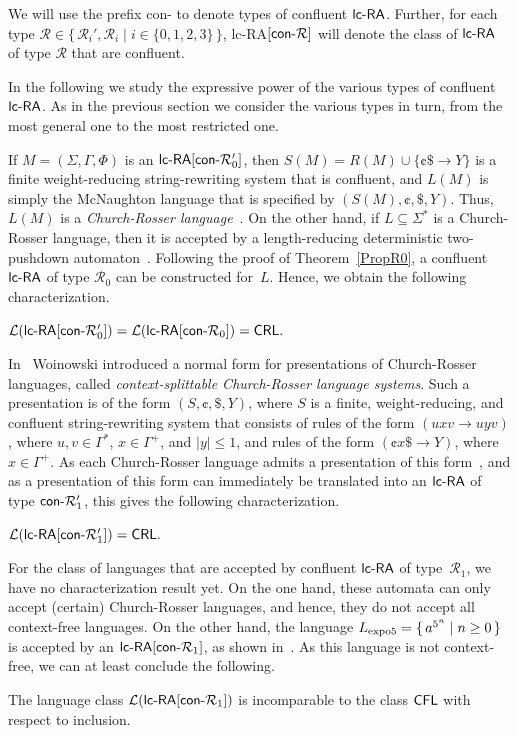 We will use the prefix {\sf con-} to denote types of confluent $\lcRA$. Further, for each type $\mathcal{R}\in\{\,\mathcal{R}_i',\mathcal{R}_i\mid i\in\{0,1,2,3\}\,\}$, {\sf lc-RA$[\textup{\sf con-}\mathcal{R}]$} will denote the class of $\lcRA$ of type $\mathcal{R}$ that are confluent.

In the following we study the expressive power of the various types of confluent $\lcRA$. As in the previous section we consider the various types in turn, from the most general one to the most restricted one.

If $M=(\Sigma,\Gamma,\Phi)$ is an $\textup{\sf lc-RA$[\textup{\sf con-}\mathcal{R}_0']$}$, then $S(M) = R(M) \cup  \{\cent\$\to Y\}$ is a finite weight-reducing string-rewriting system that is confluent, and $L(M)$ is simply the McNaughton language that is specified by $(S(M),\cent,\$,Y)$. Thus, $L(M)$ is a \emph{Church-Rosser language}~\cite{MNO88}. On the other hand, if $L\subseteq\Sigma^*$ is a Church-Rosser language, then it is accepted by a length-reducing deterministic two-pushdown automaton~\cite{N2005}. Following the proof of Theorem~\ref{PropR0}, a confluent $\lcRA$ of type $\mathcal{R}_0$ can be constructed for~$L$. Hence, we obtain the following characterization.
%
\begin{theorem}\label{PropConR0}
${\mathcal L}(\textup{\sf lc-RA$[\textup{\sf con-}\mathcal{R}_0']$}) = {\mathcal L}(\textup{\sf lc-RA$[\textup{\sf con-}\mathcal{R}_0]$}) = \textup{\sf CRL}.$
\end{theorem}

In~\cite{Woi03} Woinowski introduced a normal form for presentations of Church-Rosser languages, called \emph{context-splittable Church-Rosser language systems}. Such a presentation is of the form $(S,\cent,\$,Y)$, where $S$ is a finite, weight-reducing, and confluent string-rewriting system that consists of rules of the form $(uxv\to uyv)$, where $u,v\in\Gamma^*$, $x\in\Gamma^+$, and $|y|\le 1$, and rules of the form $(\cent x\$\to Y)$, where $x\in\Gamma^+$. As each Church-Rosser language admits a presentation of this form~\cite{Woi03}, and as a presentation of this form can immediately be translated into an $\lcRA$ of type $\textup{\sf con-}\mathcal{R}_1'$, this gives the following characterization.

\begin{theorem}\label{PropConR1prim}
${\mathcal L}(\textup{\sf lc-RA$[\textup{\sf con-}\mathcal{R}_1']$}) = \textup{\sf CRL}.$
\end{theorem}

For the class of languages that are accepted by confluent $\lcRA$ of type~$\mathcal{R}_1$,
we have no characterization result yet. On the one hand, these automata can only accept (certain) Church-Rosser languages, and hence, they do not accept all context-free languages. On the other hand, the language  $L_{\rm expo5} = \{\,a^{5^n}\mid n\ge 0\,\}$ is accepted by an $\textup{\sf lc-RA$[\textup{\sf con-}\mathcal{R}_1]$}$, as shown in~\cite{OCM12}. As this language is not context-free, we can at least conclude the following.
%
\begin{corollary}\label{CorConR1}
The language class ${\mathcal L}(\textup{\sf lc-RA$[\textup{\sf con-}\mathcal{R}_1]$})$ is incomparable to the class $\textup{\sf CFL}$ with respect to inclusion.
\end{corollary}

